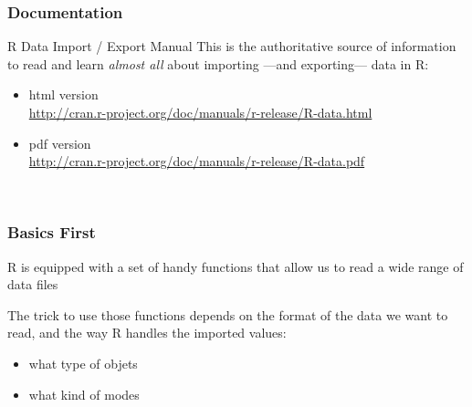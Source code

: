 \documentclass{beamer}\usepackage[]{graphicx}\usepackage[]{color}
\begin{document}
\begin{frame}
\frametitle{Documentation}

\begin{block}{R Data Import / Export Manual}
This is the authoritative source of information to read and learn \textit{almost all} about importing ---and exporting--- data in R:
 \begin{itemize}
  \item html version \\
  { \scriptsize \url{http://cran.r-project.org/doc/manuals/r-release/R-data.html} }
  \item pdf version \\
  { \scriptsize \url{http://cran.r-project.org/doc/manuals/r-release/R-data.pdf} }
  \end{itemize}
\end{block}

\vspace{5mm}
{ \scriptsize 
{}  \\
 
}

\end{frame}


\begin{frame}
\frametitle{Basics First}

R is equipped with a set of handy functions that allow us to read a wide range of data files

\bigskip

The trick to use those functions depends on the format of the data we want to read, and the way R handles the imported values:
\begin{itemize}
 \item what type of objets  
 \item what kind of modes 
\end{itemize}

\end{frame}

\end{document}
